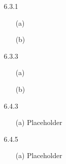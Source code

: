 \documentclass[11pt]{article}
\begin{document}
\begin{itemize}
    \item[6.3.1]
        \begin{itemize}
            \item[(a)]

            \item[(b)]
        \end{itemize}

    \item[6.3.3]
        \begin{itemize}
            \item[(a)]

            \item[(b)]
        \end{itemize}

    \item[6.4.3]
        \begin{itemize}
            \item[(a)]
                Placeholder
        \end{itemize}

    \item[6.4.5]
        \begin{itemize}
            \item[(a)]
                Placeholder
        \end{itemize}
\end{itemize}

\end{document}
